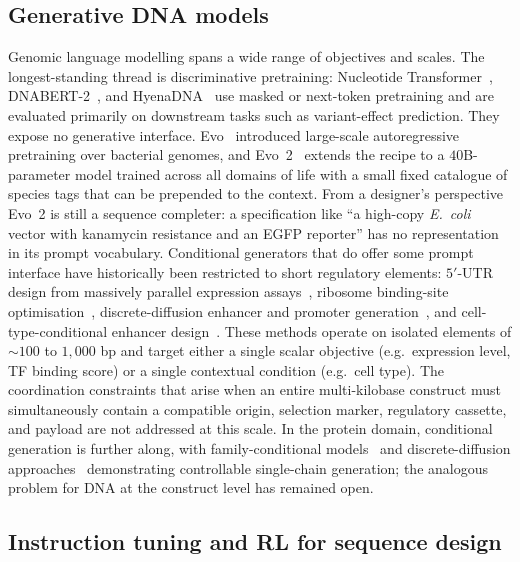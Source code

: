 \documentclass{article}
\begin{document}
\subsection{Generative DNA models}
\label{sec:related-dna}

Genomic language modelling spans a wide range of objectives and scales. The
longest-standing thread is discriminative pretraining: Nucleotide
Transformer~\citep{dalla2023nucleotide}, DNABERT-2~\citep{zhou2024dnabert2}, and
HyenaDNA~\citep{nguyen2024hyenadna} use masked or next-token pretraining and are
evaluated primarily on downstream tasks such as variant-effect prediction. They expose
no generative interface. Evo~\citep{evo2024} introduced large-scale autoregressive
pretraining over bacterial genomes, and Evo~2~\citep{brixi2025evo2} extends the recipe
to a $40$B-parameter model trained across all domains of life with a small fixed
catalogue of species tags that can be prepended to the context. From a designer's
perspective Evo~2 is still a sequence completer: a specification like ``a high-copy
\textit{E.~coli} vector with kanamycin resistance and an EGFP reporter'' has no
representation in its prompt vocabulary. Conditional generators that do offer some prompt
interface have historically been restricted to short regulatory elements: $5'$-UTR
design from massively parallel expression assays~\citep{sample2019promoter}, ribosome
binding-site optimisation~\citep{salis2009}, discrete-diffusion enhancer and promoter
generation~\citep{stark2024dirichlet}, and cell-type-conditional enhancer
design~\citep{chen2024leonine,taskiran2024cre}. These methods operate on isolated
elements of $\sim\!100$ to $1{,}000$ bp and target either a single scalar objective
(e.g.\ expression level, TF binding score) or a single contextual condition (e.g.\ cell
type). The coordination constraints that arise when an entire multi-kilobase construct
must simultaneously contain a compatible origin, selection marker, regulatory cassette,
and payload are not addressed at this scale. In the protein domain, conditional
generation is further along, with family-conditional models~\citep{madani2023progen}
and discrete-diffusion approaches~\citep{alamdari2023evodiff} demonstrating controllable
single-chain generation; the analogous problem for DNA at the construct level has
remained open.

\subsection{Instruction tuning and RL for sequence design}
\label{sec:related-rl}
\end{document}
